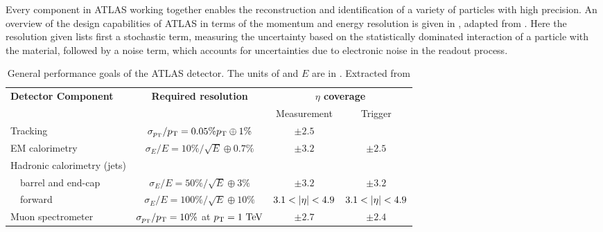 Every component in \ac{ATLAS} working together enables the reconstruction and identification of a variety of particles with high precision. An overview of the design capabilities of \ac{ATLAS} in terms of the momentum and energy resolution is given in \Tab{\ref{tab:atlas:atlas:expected_performance}}, adapted from .
Here the resolution given lists first a stochastic term, measuring the uncertainty based on the statistically dominated interaction of a particle with the material, followed by a noise term, which accounts for uncertainties due to electronic noise in the readout process. 


\begin{table}[]
    \caption{General performance goals of the \ac{ATLAS} detector. The units of \pt and \(E\) are in \gev. Extracted from }
    \begin{tabular}{|l|c|c|c|}
        \hline
        \multirow{2}{*}{\textbf{Detector Component}}    & \multirow{2}{*}{\textbf{Required resolution}}     & \multicolumn{2}{c|}{\textbf{$\eta$ coverage}}             \\\cline{3-4} 
                                                        &                                                   & Measurement              & Trigger                        \\ \hline
        Tracking                                        & \( \sigma_{p_{\text{T}}}/p_{\text{T}} = 0.05\%p_{\text{T}} \oplus 1\%    \)  & \( \pm 2.5 \)            &                                \\ \hline
        EM calorimetry                                  & \( \sigma_{E}/E = 10\%/\sqrt{E} \oplus 0.7\%  \)  & \( \pm 3.2 \)            & \( \pm 2.5 \)                  \\ \hline
        Hadronic calorimetry (jets)                     &                                                   &                          &                                \\
        $\quad$barrel and end-cap                       & \( \sigma_{E}/E = 50\%/\sqrt{E} \oplus 3\%    \)  & \( \pm 3.2 \)            & \( \pm 3.2 \)                  \\
        $\quad$forward                                  & \( \sigma_{E}/E = 100\%/\sqrt{E} \oplus 10\%  \)  & \( 3.1 < |\eta|< 4.9 \) & \( 3.1 < |\eta|< 4.9 \)       \\ \hline
        Muon spectrometer                               & \( \sigma_{p_{\text{T}}}/p_{\text{T}} = 10\%\) at \(p_{\text{T}} =1~\text{TeV} \)  & \( \pm 2.7 \)            & \( \pm 2.4 \)                  \\
        \hline
    \end{tabular}
    \label{tab:atlas:atlas:expected_performance}
\end{table}

